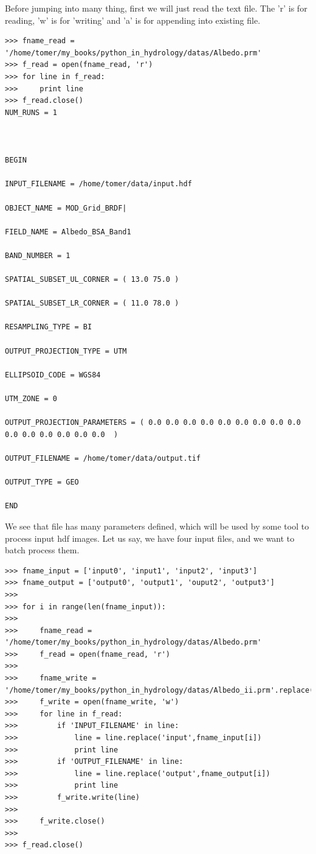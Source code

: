 \documentclass[10pt]{book}
\begin{document}
Before jumping into many thing, first we will just read the text file. The 'r' is for reading, 'w' is for 'writing' and 'a' is for appending into existing file. 
\beforeverb \begin{verbatim}
>>> fname_read = '/home/tomer/my_books/python_in_hydrology/datas/Albedo.prm'
>>> f_read = open(fname_read, 'r')
>>> for line in f_read:
>>>     print line
>>> f_read.close()
NUM_RUNS = 1



BEGIN

INPUT_FILENAME = /home/tomer/data/input.hdf

OBJECT_NAME = MOD_Grid_BRDF|

FIELD_NAME = Albedo_BSA_Band1

BAND_NUMBER = 1

SPATIAL_SUBSET_UL_CORNER = ( 13.0 75.0 )

SPATIAL_SUBSET_LR_CORNER = ( 11.0 78.0 )

RESAMPLING_TYPE = BI

OUTPUT_PROJECTION_TYPE = UTM

ELLIPSOID_CODE = WGS84

UTM_ZONE = 0

OUTPUT_PROJECTION_PARAMETERS = ( 0.0 0.0 0.0 0.0 0.0 0.0 0.0 0.0 0.0 0.0 0.0 0.0 0.0 0.0 0.0  )

OUTPUT_FILENAME = /home/tomer/data/output.tif

OUTPUT_TYPE = GEO

END
\end{verbatim} \afterverb
We see that file has many parameters defined, which will be used by some tool to process input hdf images. Let us say, we have four input files, and we want to batch process them.

\beforeverb \begin{verbatim}
>>> fname_input = ['input0', 'input1', 'input2', 'input3']
>>> fname_output = ['output0', 'output1', 'ouput2', 'output3']
>>> 
>>> for i in range(len(fname_input)):
>>>     
>>>     fname_read = '/home/tomer/my_books/python_in_hydrology/datas/Albedo.prm'
>>>     f_read = open(fname_read, 'r')
>>> 
>>>     fname_write = '/home/tomer/my_books/python_in_hydrology/datas/Albedo_ii.prm'.replace('ii',str(i))
>>>     f_write = open(fname_write, 'w')
>>>     for line in f_read:
>>>         if 'INPUT_FILENAME' in line:
>>>             line = line.replace('input',fname_input[i])
>>>             print line
>>>         if 'OUTPUT_FILENAME' in line:
>>>             line = line.replace('output',fname_output[i])
>>>             print line
>>>         f_write.write(line)
>>>         
>>>     f_write.close()
>>> 
>>> f_read.close()
\end{verbatim} \afterverb
\end{document}
